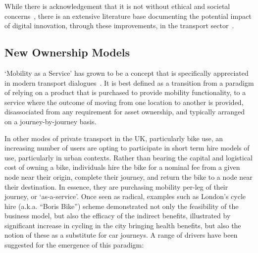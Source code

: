 \documentclass[journal]{IEEEtran}
\begin{document}
While there is acknowledgement that it is not without ethical and
societal concerns~\cite{bimber:1990,oatley-et-al_dasc:2015}, there is
an extensive literature base documenting the potential impact of
digital innovation, through these improvements, in the transport
sector~\cite{enoch:2015}.


\subsection{New Ownership Models}

`Mobility as a Service' has grown to be a concept that is specifically
appreciated in modern transport dialogues~\cite{tscatapult:2016}. It
is best defined as a transition from a paradigm of relying on a
product that is purchased to provide mobility functionality, to a
service where the outcome of moving from one location to another is
provided, disassociated from any requirement for asset ownership, and
typically arranged on a journey-by-journey basis.

In other modes of private transport in the UK, particularly bike use,
an increasing number of users are opting to participate in short term
hire models of use, particularly in urban contexts. Rather than
bearing the capital and logistical cost of owning a bike, individuals
hire the bike for a nominal fee from a given node near their origin,
complete their journey, and return the bike to a node near their
destination. In essence, they are purchasing mobility per-leg of their
journey, or `as-a-service'. Once seen as radical, examples such as
London’s cycle hire (a.k.a. ``Boris Bike'') scheme demonstrated not
only the feasibility of the business model, but also the efficacy of
the indirect benefits, illustrated by significant increase in cycling
in the city bringing health benefits, but also the notion of these as
a substitute for car journeys. A range of drivers have been suggested
for the emergence of this paradigm:
\end{document}
